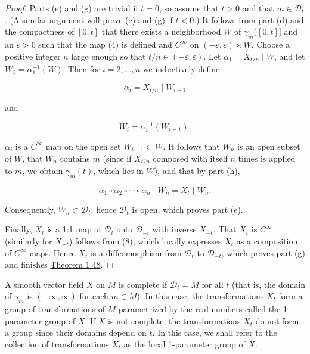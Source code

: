 \begin{proof}
	Parts (e) and (g) are trivial if $t=0$, so assume that $t>0$ and that $m\in\mathcal{D}_t$. (A similar argument will prove (e) and (g) if $t<0$.) It follows from part (d) and the compactness of $[0,t]$ that there exists a neighborhood $W$ of $\gamma_m([0,t]]$ and an $\varepsilon>0$ such that the map (4) is defined and $C^\infty$ on $(-\varepsilon,\varepsilon)\times W$. Choose a positive integer $n$ large enough so that $t/n\in(-\varepsilon,\varepsilon)$. Let $\alpha_1=X_{t/n}\mid W$, and let $W_1=\alpha_1^{-1}(W)$. Then for $i=2,\ldots,n$ we inductively define

	\[
		\alpha_{i}=X_{t/n}\mid W_{i-1}
	\]

	and

	\[
		W_{i}=\alpha_{i}^{-1}(W_{i-1}).
	\]

	$\alpha_{i}$ is a $C^{\infty}$ map on the open set $W_{i-1} \subset W$. It follows that $W_{n}$ is an open subset of $W$, that $W_{n}$ contains $m$ (since if $X_{t/n}$ composed with itself $n$ times is applied to $m$, we obtain $\gamma_{m}(t)$, which lies in $W$), and that by part (h),

	\begin{equation}
		\tag{8}\label{eq:1.48:8}
		\alpha_{1}\circ\alpha_{2}\circ\cdots\circ\alpha_{n}\mid W_{n}=X_{t}\mid W_{n}.
	\end{equation}

	Consequently, $W_{n} \subset \mathcal{D}_{t}$; hence $\mathcal{D}_{t}$ is open, which proves part (e).

	Finally, $X_{t}$ is a 1:1 map of $\mathcal{D}_{t}$ onto $\mathcal{D}_{-t}$ with inverse $X_{-t}$. That $X_{t}$ is $C^{\infty}$ (similarly for $X_{-t}$) follows from (8), which locally expresses $X_{t}$ as a composition of $C^{\infty}$ maps. Hence $X_{t}$ is a diffeomorphism from $\mathcal{D}_{t}$ to $\mathcal{D}_{-t}$, which proves part (g) and finishes \hyperref[thm:1.48]{Theorem 1.48}.

\end{proof}

\begin{definition}\label{thm:1.49}
	A smooth vector field $X$ on $M$ is complete if $\mathcal{D}_t = M$ for all $t$ (that is, the domain of $\gamma_m$ is $(-\infty, \infty)$ for each $m \in M$). In this case, the transformations $X_t$ form a group of transformations of $M$ parametrized by the real numbers called the 1-parameter group of $X$. If $X$ is not complete, the transformations $X_t$ do not form a group since their domains depend on $t$. In this case, we shall refer to the collection of transformations $X_t$ as the local 1-parameter group of $X$. 

\end{definition}


